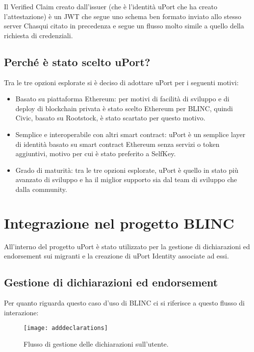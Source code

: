 Il Verified Claim creato dall’issuer (che è l’identità uPort che ha creato l’attestazione)
è un JWT che segue uno schema ben formato inviato allo stesso server Chasqui citato
in precedenza e segue un flusso molto simile a quello della richiesta di credenziali.

\subsection{Perché è stato scelto uPort?}

Tra le tre opzioni esplorate si è deciso di adottare uPort per i seguenti motivi:

\begin{itemize}
    \item Basato su piattaforma Ethereum: per motivi di facilità di sviluppo e di deploy di blockchain privata è stato scelto
    Ethereum per BLINC, quindi Civic, basato su Rootstock, è stato scartato per questo motivo.
    \item Semplice e interoperabile con altri smart contract: uPort è un semplice layer di identità basato su 
    smart contract Ethereum senza servizi o token aggiuntivi, motivo per cui è stato preferito a SelfKey.
    \item Grado di maturità: tra le tre opzioni esplorate, uPort è quello in stato più avanzato di sviluppo e ha il miglior supporto
    sia dal team di sviluppo che dalla community.
\end{itemize}

\section{Integrazione nel progetto BLINC}

All’interno del progetto uPort è stato utilizzato per la gestione di dichiarazioni
ed endorsement sui migranti e la creazione di uPort Identity associate ad essi.

\subsection{Gestione di dichiarazioni ed endorsement}
Per quanto riguarda questo caso d’uso di BLINC ci si
riferisce a questo flusso di interazione:

\begin{figure}[!ht]
    \texttt{[image: adddeclarations]}
    \caption{Flusso di gestione delle dichiarazioni sull'utente.}
    \label{fig:adddeclarations}
  \end{figure}

